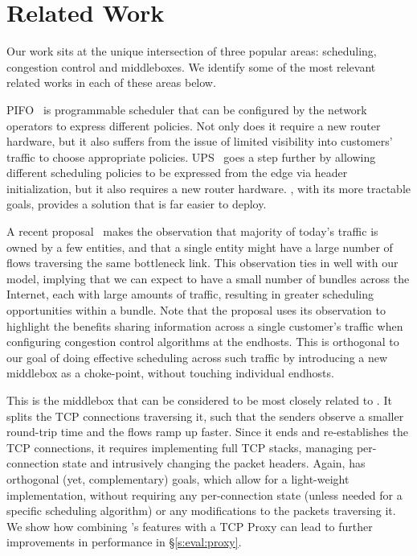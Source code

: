 \section{Related Work}
\label{s:related}

Our work sits at the unique intersection of three popular areas: scheduling, congestion control and middleboxes. We identify some of the most relevant related works in each of these areas below. 

 PIFO~\cite{pifo} is programmable scheduler that can be configured by the network operators to express different policies. Not only does it require a new router hardware, but it also suffers from the issue of limited visibility into customers' traffic to choose appropriate policies. UPS~\cite{ups} goes a step further by allowing different scheduling policies to be expressed from the edge via header initialization, 
but it also requires a new router hardware. \name, with its more tractable goals, provides a solution that is far easier to deploy. 

 A recent proposal~\cite{fivecomps} makes the observation that majority of today's traffic is owned by a few entities, and that a single entity might have a large number of flows traversing the same bottleneck link. This observation ties in well with our model, implying that we can expect to have a small number of bundles across the Internet, each with large amounts of traffic, resulting in greater scheduling opportunities within a bundle. Note that the proposal uses its observation to highlight the benefits sharing information across a single customer's traffic when configuring congestion control algorithms at the endhosts. This is orthogonal to our goal of doing effective scheduling across such traffic by introducing a new middlebox as a choke-point, without touching individual endhosts. 

 This is the middlebox that can be considered to be most closely related to \name. It splits the TCP connections traversing it, such that the senders observe a smaller round-trip time and the flows ramp up faster. Since it ends and re-establishes the TCP connections, it requires implementing full TCP stacks, managing per-connection state and intrusively changing the packet headers. Again, \name has orthogonal (yet, complementary) goals, which allow for a light-weight implementation, without requiring any per-connection state (unless needed for a specific scheduling algorithm) or any modifications to the packets traversing it. We show how combining \name's features with a TCP Proxy can lead to further improvements in performance in \S\ref{s:eval:proxy}. 

